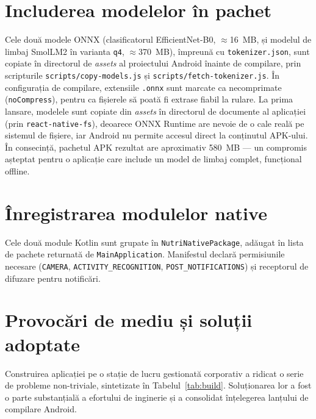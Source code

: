\documentclass[12pt, a4paper, twoside]{report}
\numberwithin{equation}{section}
\begin{document}
\section{Includerea modelelor în pachet}

Cele două modele ONNX (clasificatorul EfficientNet-B0, $\approx$16~MB, și modelul de limbaj
SmolLM2 în varianta \texttt{q4}, $\approx$370~MB), împreună cu \texttt{tokenizer.json}, sunt
copiate în directorul de \textit{assets} al proiectului Android înainte de compilare, prin
scripturile \texttt{scripts/\allowbreak copy-models.js} și \texttt{scripts/\allowbreak fetch-tokenizer.js}. În
configurația de compilare, extensiile \texttt{.onnx} sunt marcate ca necomprimate
(\texttt{noCompress}), pentru ca fișierele să poată fi extrase fiabil la rulare. La prima
lansare, modelele sunt copiate din \textit{assets} în directorul de documente al aplicației
(prin \texttt{react-native-fs}), deoarece ONNX Runtime are nevoie de o cale reală pe sistemul
de fișiere, iar Android nu permite accesul direct la conținutul APK-ului. În consecință,
pachetul APK rezultat are aproximativ 580~MB --- un compromis așteptat pentru o aplicație care
include un model de limbaj complet, funcțional offline.

\section{Înregistrarea modulelor native}

Cele două module Kotlin sunt grupate în \texttt{NutriNativePackage}, adăugat în lista de pachete
returnată de \texttt{MainApplication}. Manifestul declară permisiunile necesare
(\texttt{CAMERA}, \texttt{ACTIVITY\_RECOGNITION}, \texttt{POST\_NOTIFICATIONS}) și receptorul de
difuzare pentru notificări.

\section{Provocări de mediu și soluții adoptate}

Construirea aplicației pe o stație de lucru gestionată corporativ a ridicat o serie de probleme
non-triviale, sintetizate în Tabelul~\ref{tab:build}. Soluționarea lor a fost o parte
substanțială a efortului de inginerie și a consolidat înțelegerea lanțului de compilare Android.
\end{document}
